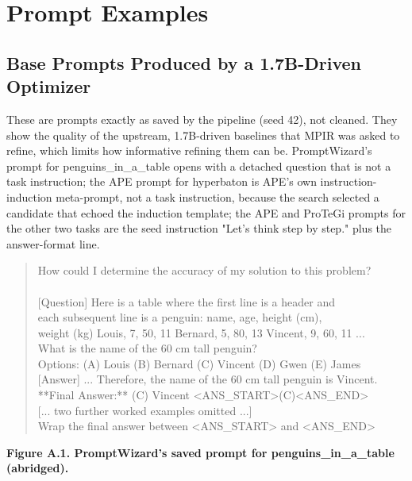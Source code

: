 \documentclass{ieeeaccess}
\begin{document}
\appendices

\section{Prompt Examples}

\subsection{Base Prompts Produced by a 1.7B-Driven Optimizer}

These are prompts exactly as saved by the pipeline (seed 42), not cleaned. They show the quality of the upstream, 1.7B-driven baselines that MPIR was asked to refine, which limits how informative refining them can be. PromptWizard's prompt for penguins\_\allowbreak{}in\_\allowbreak{}a\_\allowbreak{}table opens with a detached question that is not a task instruction; the APE prompt for hyperbaton is APE's own instruction-induction meta-prompt, not a task instruction, because the search selected a candidate that echoed the induction template; the APE and ProTeGi prompts for the other two tasks are the seed instruction "Let's think step by step." plus the answer-format line.

\centering
\begin{quote}\ttfamily\small
How could I determine the accuracy of my solution to this problem?\\{}
~\\{}
[Question] Here is a table where the first line is a header and\\{}
each subsequent line is a penguin: name, age, height (cm),\\{}
weight (kg) Louis, 7, 50, 11 Bernard, 5, 80, 13 Vincent, 9, 60, 11 ...\\{}
What is the name of the 60 cm tall penguin?\\{}
Options: (A) Louis (B) Bernard (C) Vincent (D) Gwen (E) James\\{}
[Answer] ... Therefore, the name of the 60 cm tall penguin is Vincent.\\{}
**Final Answer:** (C) Vincent <ANS\_\allowbreak{}START>(C)<ANS\_\allowbreak{}END>\\{}
[... two further worked examples omitted ...]\\{}
Wrap the final answer between <ANS\_\allowbreak{}START> and <ANS\_\allowbreak{}END>\\{}
\end{quote}
\par\noindent\textbf{Figure A.1. PromptWizard's saved prompt for penguins\_\allowbreak{}in\_\allowbreak{}a\_\allowbreak{}table (abridged).}
\end{document}
